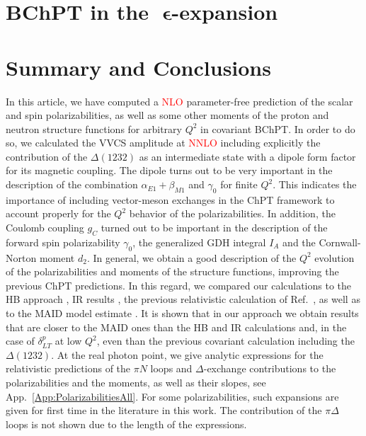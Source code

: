 \documentclass[twocolumn,prc,showpacs,nofootinbib,preprintnumbers,amsmath,amssymb,superscriptaddress]{revtex4-1}
\begin{document}
 \section{BChPT in the $\;\boldsymbol{\epsilon}$-expansion}
\label{Sec:newDiagrams}

\section{Summary and Conclusions}\label{Sec:Summary}

In this article, we have computed a \textcolor{red}{NLO} parameter-free prediction of the scalar and spin polarizabilities, as well as some other moments of the proton and neutron structure functions for arbitrary $Q^2$ in covariant BChPT. 
In order to do so, we calculated the VVCS amplitude at \textcolor{red}{NNLO} including explicitly the contribution of the $\Delta(1232)$ as an intermediate state with a dipole form factor for its magnetic coupling. 
The dipole turns out to be very important in the description of the combination $\alpha_{E1}+\beta_{M1}$ and $\gamma_0$ for finite $Q^2$.
This indicates the importance of including vector-meson exchanges in the ChPT framework to account properly for the $Q^2$ behavior of the polarizabilities. 
In addition, the Coulomb coupling $g_C$ turned out to be important in the description of the forward spin polarizability $\gamma_0$, the generalized GDH integral $I_A$ and the Cornwall-Norton moment $d_2$.
In general, we obtain a good description of the $Q^2$ evolution of the polarizabilities and moments of the structure functions, improving the previous ChPT predictions.
In this regard, we compared our calculations to the HB approach \cite{Kao:2002cp}, IR results \cite{Bernard:2002pw}, the previous relativistic calculation of Ref.~\cite{Bernard:2012hb}, as well as to the MAID model estimate \cite{MAID}. 
It is shown that in our approach we obtain results that are closer to the MAID ones than the HB and IR calculations and, in the case of $\delta^p_{LT}$ at low $Q^2$, even than the previous covariant calculation including the $\Delta(1232)$. 
At the real photon point, we give analytic expressions for the relativistic predictions of the $\pi N$ loops and $\Delta$-exchange contributions to the polarizabilities and the moments, as well as their slopes, see App.~\ref{App:PolarizabilitiesAll}.
For some polarizabilities, such expansions are given for first time in the literature in this work. 
The contribution of the $\pi \Delta$ loops is not shown due to the length of the  expressions.
 
\end{document}
